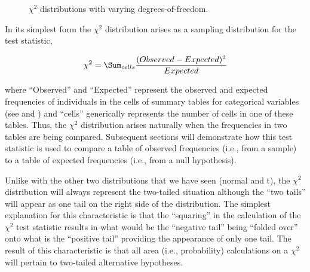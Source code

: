 \documentclass[10pt,openany]{book}\usepackage[]{graphicx}\usepackage[]{color}
\newenvironment{knitrout}{}{} %
\begin{document}
\begin{knitrout}
\color{fgcolor}








\begin{figure}[hbtp]

{\centering {}

}

\caption[$\chi^2$ distributions with varying degrees-of-freedom]{$\chi^2$ distributions with varying degrees-of-freedom.}\label{fig:chiDist}
\end{figure}


\end{knitrout}

In its simplest form the $\chi^2$ distribution arises as a sampling distribution for the test statistic,

\[ \chi^{2} = \Sum_{cells}\frac{(Observed-Expected)^{2}}{Expected} \]

where ``Observed'' and ``Expected'' represent the observed and expected frequencies of individuals in the cells of summary tables for categorical variables (see  and ) and ``cells'' generically represents the number of cells in one of these tables.  Thus, the $\chi^2$ distribution arises naturally when the frequencies in two tables are being compared.  Subsequent sections will demonstrate how this test statistic is used to compare a table of observed frequencies (i.e., from a sample) to a table of expected frequencies (i.e., from a null hypothesis).

Unlike with the other two distributions that we have seen (normal and t), the $\chi^2$ distribution will always represent the two-tailed situation although the ``two tails'' will appear as one tail on the right side of the distribution.  The simplest explanation for this characteristic is that the ``squaring'' in the calculation of the $\chi^{2}$ test statistic results in what would be the ``negative tail'' being ``folded over'' onto what is the ``positive tail'' providing the appearance of only one tail.  The result of this characteristic is that all area (i.e., probability) calculations on a $\chi^{2}$ will pertain to two-tailed alternative hypotheses.

\end{document}
